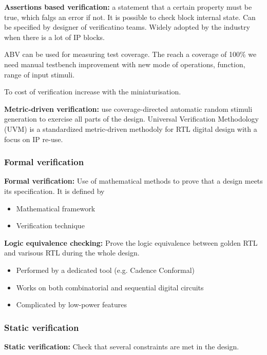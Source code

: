 \textbf{Assertions based verification:} a statement that a certain property must be true, which falgs an error if not. It is possible to check block internal state. Can be specified by designer of verificatino teams. Widely adopted by the industry when there is a lot of IP blocks.

\bigbreak
ABV can be used for measuring test coverage. The reach a coverage of 100\% we need manual testbench improvement with new mode of operations, function, range of input stimuli. 


To cost of verification increase with the miniaturisation.

\textbf{Metric-driven verification:} use coverage-directed automatic random stimuli generation to exercise all parts of the design. Universal Verification Methodology (UVM) is a standardized metric-driven methodoly for RTL digital design with a focus on IP re-use.
\subsubsection{Formal verification}
\textbf{Formal verification:} Use of mathematical methods to prove that a design meets its specification. It is defined by
\begin{itemize}
  \item Mathematical framework
  \item Verification technique
\end{itemize}

\textbf{Logic equivalence checking:} Prove the logic equivalence between golden RTL and varisous RTL during the whole design.
\begin{itemize}
  \item Performed by a dedicated tool (e.g. Cadence Conformal)
  \item Works on both combinatorial and sequential digital circuits
  \item Complicated by low-power features
\end{itemize}


\subsubsection{Static verification}
\textbf{Static verification: } Check that several constraints are met in the design.
